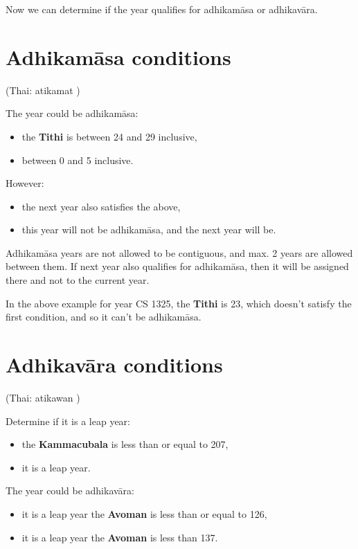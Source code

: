\documentclass[11pt,oneside]{memoir-article}
\begin{document}
Now we can determine if the year qualifies for adhikamāsa or adhikavāra.

\section{Adhikamāsa conditions}
\label{sec-5-3}
\label{adhikamasa-years}

(Thai: atikamat )

The year could be adhikamāsa:

\begin{itemize}
\item {} the \textbf{Tithi} is between 24 and 29 inclusive,
\item {} between 0 and 5 inclusive.
\end{itemize}

However:

\begin{itemize}
\item {} the next year also satisfies the above,
\item {} this year will not be adhikamāsa, and the next year will be.
\end{itemize}

Adhikamāsa years are not allowed to be contiguous, and max. 2 years are allowed
between them. If next year also qualifies for adhikamāsa, then it will be
assigned there and not to the current year.

In the above example for year CS 1325, the \textbf{Tithi} is 23, which doesn't satisfy
the first condition, and so it can't be adhikamāsa.

\section{Adhikavāra conditions}
\label{sec-5-4}
\label{adhikavara-years}

(Thai: atikawan )

Determine if it is a leap year:

\begin{itemize}
\item {} the \textbf{Kammacubala} is less than or equal to 207,
\item {} it is a leap year.
\end{itemize}

The year could be adhikavāra:

\begin{itemize}
\item {} it is a leap year  the \textbf{Avoman} is less than or equal to 126,
\item {} it is  a leap year  the \textbf{Avoman} is less than 137.
\end{itemize}
\end{document}
